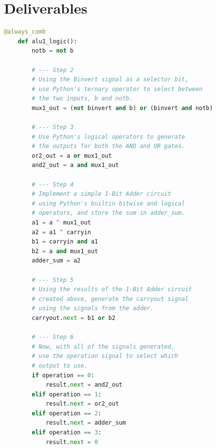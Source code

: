 \documentclass{article}
\begin{document}
\section{Deliverables}
    \begin{lstlisting}[language=Python,frame=tb]
    @always_comb 
    def alu1_logic():
        notb = not b

        # --- Step 2
        # Using the Binvert signal as a selector bit,
        # use Python's ternary operator to select between
        # the two inputs, b and notb.
        mux1_out = (not binvert and b) or (binvert and notb)

        # --- Step 3
        # Use Python's logical operators to generate
        # the outputs for both the AND and OR gates.
        or2_out = a or mux1_out
        and2_out = a and mux1_out
        
        # --- Step 4
        # Implement a simple 1-Bit Adder circuit
        # using Python's builtin bitwise and logical
        # operators, and store the sum in adder_sum.
        a1 = a ^ mux1_out
        a2 = a1 ^ carryin
        b1 = carryin and a1
        b2 = a and mux1_out
        adder_sum = a2
        
        # --- Step 5
        # Using the results of the 1-Bit Adder circuit
        # created above, generate the carryout signal
        # using the signals from the adder.
        carryout.next = b1 or b2

        # --- Step 6
        # Now, with all of the signals generated,
        # use the operation signal to select which
        # output to use.
        if operation == 0:
            result.next = and2_out
        elif operation == 1:
            result.next = or2_out
        elif operation == 2:
            result.next = adder_sum
        elif operation == 3:
            result.next = 0
    \end{lstlisting}

\break
\end{document}
